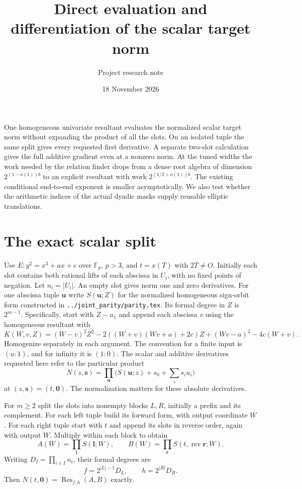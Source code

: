 \documentclass[11pt]{article}
\title{Direct evaluation and differentiation of the scalar target norm}
\author{Project research note}
\date{18 November 2026}
\newcommand{\F}{\mathbb F}
\newcommand{\Res}{\operatorname{Res}}
\begin{document}
\maketitle

One homogeneous univariate resultant evaluates the normalized scalar
target norm without expanding the product of all the slots.
On an isolated tuple the same split gives every requested first
derivative. A separate two-slot calculation gives the full additive
gradient even at a nonzero norm. At the tuned widths the work needed
by the relation finder drops from a dense root algebra of dimension
$2^{(1-o(1))b}$ to an explicit resultant with work
$2^{(1/2+o(1))b}$. The existing conditional end-to-end exponent
is smaller asymptotically. We also test whether the arithmetic indices
of the actual dyadic masks supply reusable elliptic translations.

\section{The exact scalar split}
Use $E:y^2=x^3+ax+c$ over $\F_p$, $p>3$, and $t=x(T)$ with
$2T\ne O$. Initially each slot contains both rational lifts of
each abscissa in $U_i$, with no fixed points of negation. Let
$n_i=|U_i|$. An empty slot gives norm one and zero derivatives.
For one abscissa tuple $\mathbf u$ write $S(\mathbf u;Z)$ for
the normalized homogeneous sign-orbit form constructed in
\texttt{../joint\_parity/parity.tex}. Its formal degree in $Z$ is
$2^{m-1}$. Specifically, start with $Z-u_1$ and append each
abscissa $v$ using the homogeneous resultant with
\[
 K(W,v,Z)=(W-v)^2 Z^2-2((W+v)(Wv+a)+2c)Z+(Wv-a)^2-4c(W+v).
\]
Homogenize separately in each argument. The convention for a finite
input is $(u:1)$, and for infinity it is $(1:0)$. The scalar and
additive derivatives requested here refer to the particular product
\[
 N(z,\mathbf s)=\prod_{\mathbf u}
  \big(S(\mathbf u;z)+s_0+\textstyle\sum_i s_i u_i\big)
\]
at $(z,\mathbf s)=(t,\mathbf0)$. The normalization matters for
these absolute derivatives.

For $m\ge2$ split the slots into nonempty blocks $L,R$, initially
a prefix and its complement. For each left tuple build its forward
form, with output coordinate $W$. For each right tuple start with
$t$ and append its slots in reverse order, again with output $W$.
Multiply within each block to obtain
\[
 A(W)=\prod_{\mathbf l} S(\mathbf l;W),\qquad
 B(W)=\prod_{\mathbf r} S(t,\operatorname{rev}\mathbf r;W).
\]
Writing $D_I=\prod_{i\in I} n_i$, their formal degrees are
\[
 f=2^{|L|-1}D_L,\qquad h=2^{|R|}D_R .
\]
Then $N(t,\mathbf0)=\Res_{f,h}(A,B)$ exactly.
\end{document}
